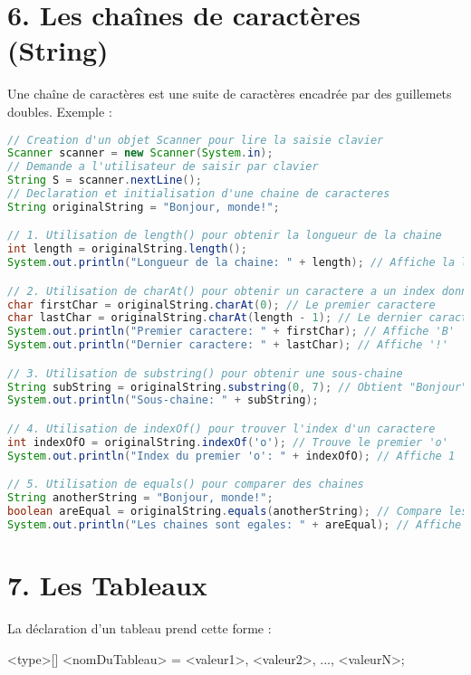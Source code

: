 \documentclass{article}
\begin{document}
\section*{6. Les chaînes de caractères (String)}
Une chaîne de caractères est une suite de caractères encadrée par des guillemets doubles. Exemple :
\begin{lstlisting}[language=Java]
// Creation d'un objet Scanner pour lire la saisie clavier
Scanner scanner = new Scanner(System.in);
// Demande a l'utilisateur de saisir par clavier
String S = scanner.nextLine();
// Declaration et initialisation d'une chaine de caracteres
String originalString = "Bonjour, monde!";

// 1. Utilisation de length() pour obtenir la longueur de la chaine
int length = originalString.length();
System.out.println("Longueur de la chaine: " + length); // Affiche la longueur de la chaine

// 2. Utilisation de charAt() pour obtenir un caractere a un index donne
char firstChar = originalString.charAt(0); // Le premier caractere
char lastChar = originalString.charAt(length - 1); // Le dernier caractere
System.out.println("Premier caractere: " + firstChar); // Affiche 'B'
System.out.println("Dernier caractere: " + lastChar); // Affiche '!'

// 3. Utilisation de substring() pour obtenir une sous-chaine
String subString = originalString.substring(0, 7); // Obtient "Bonjour"
System.out.println("Sous-chaine: " + subString);

// 4. Utilisation de indexOf() pour trouver l'index d'un caractere
int indexOfO = originalString.indexOf('o'); // Trouve le premier 'o'
System.out.println("Index du premier 'o': " + indexOfO); // Affiche 1

// 5. Utilisation de equals() pour comparer des chaines
String anotherString = "Bonjour, monde!";
boolean areEqual = originalString.equals(anotherString); // Compare les deux chaines
System.out.println("Les chaines sont egales: " + areEqual); // Affiche true
\end{lstlisting}


\section*{7. Les Tableaux}
La déclaration d'un tableau prend cette forme :

<type>[] <nomDuTableau> = {<valeur1>, <valeur2>, ..., <valeurN>};
\end{document}
